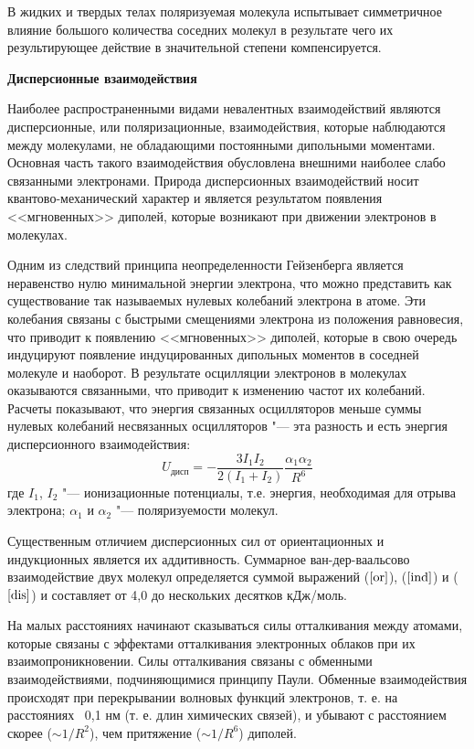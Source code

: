 \documentclass[12pt,a4paper,oneside]{book}
\begin{document}
В жидких и твердых телах поляризуемая молекула испытывает симметричное влияние большого количества соседних молекул в результате чего их результирующее действие в значительной степени компенсируется.

\textbf{Дисперсионные взаимодействия}

Наиболее распространенными видами невалентных взаимодействий являются дисперсионные, или поляризационные, взаимодействия, которые наблюдаются между молекулами, не обладающими постоянными дипольными моментами. Основная часть такого взаимодействия обусловлена внешними наиболее слабо связанными электронами. Природа дисперсионных взаимодействий носит квантово-механический характер и является результатом появления <<мгновенных>> диполей, которые возникают при движении электронов в молекулах. 

Одним из следствий принципа неопределенности Гейзенберга является неравенство нулю минимальной энергии электрона, что можно представить как существование так называемых нулевых колебаний электрона в атоме. Эти колебания связаны с быстрыми смещениями электрона из положения равновесия, что приводит к появлению <<мгновенных>> диполей, которые в свою очередь индуцируют появление индуцированных дипольных моментов в соседней молекуле и наоборот. В результате осцилляции электронов в молекулах оказываются связанными, что приводит к изменению частот их колебаний. Расчеты показывают, что энергия связанных осцилляторов меньше суммы нулевых колебаний несвязанных осцилляторов "--- эта разность и есть энергия дисперсионного взаимодействия:
\begin{equation}
\label{dis} 
U_{\text{дисп}} = - \dfrac{3 I_1 I_2}{2 (I_1+I_2)}\dfrac{\alpha_1 \alpha_2}{R^6}
\end{equation}
где $I_1$, $I_2$ "--- ионизационные потенциалы, т.е. энергия, необходимая для отрыва электрона; $\alpha_1$ и $\alpha_2$ "--- поляризуемости молекул.

Существенным отличием дисперсионных сил от ориентационных и индукционных является их аддитивность.
Суммарное ван-дер-ваальсово взаимодействие двух молекул определяется суммой выражений ($\ref{or}$), ($\ref{ind}$) и ($\ref{dis}$) и составляет от 4,0 до
нескольких десятков кДж/моль.

На малых расстояниях начинают сказываться силы отталкивания между атомами, которые связаны с эффектами отталкивания электронных облаков при их взаимопроникновении. Силы отталкивания связаны с обменными взаимодействиями, подчиняющимися принципу Паули. Обменные взаимодействия происходят при перекрывании волновых функций электронов, т. е. на расстояниях ~0,1 нм (т. е. длин химических связей), и убывают с расстоянием скорее ($\sim 1/R^2$), чем притяжение ($\sim 1/R^6$) диполей.
\end{document}
